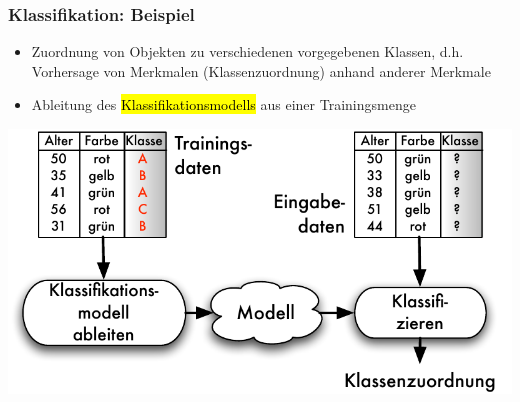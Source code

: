 \begin{frame}
\frametitle{Klassifikation: Beispiel}


\begin{itemize}
\item  Zuordnung von Objekten zu verschiedenen vorgegebenen Klassen,
  d.h. Vorhersage von Merkmalen (Klassenzuordnung) anhand anderer
  Merkmale
    \item Ableitung des \hl{Klassifikationsmodells} aus einer Trainingsmenge
\end{itemize}

\begin{center}
\includegraphics[scale=.6]{fig1/klassifikation-prinzip.pdf}
\end{center}

\end{frame}



